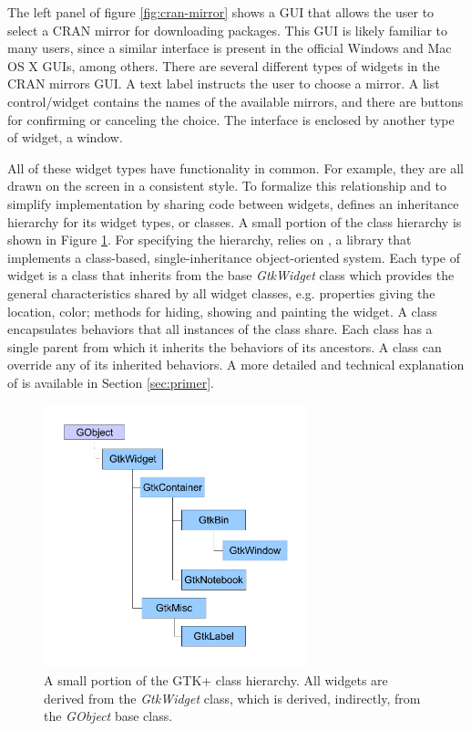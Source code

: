 \documentclass[article]{jss}
\begin{document}
The left panel of figure \ref{fig:cran-mirror} shows a  GUI
that allows the user to select a CRAN mirror for downloading
 packages.  This GUI is likely familiar to many
 users, since a similar interface is present in the
official Windows and Mac OS X  GUIs, among others.  There
are several different types of widgets in the CRAN mirrors GUI.  A
text label instructs the user to choose a mirror.  A list
control/widget contains the names of the available mirrors, and there
are buttons for confirming or canceling the choice.  The interface is
enclosed by another type of widget, a window.

All of these widget types have functionality in common. For example,
they are all drawn on the screen in a consistent style. To formalize
this relationship and to simplify implementation by sharing code
between widgets,  defines an inheritance hierarchy for its
widget types, or classes. A small portion of the  class
hierarchy is shown in Figure \ref{fig:class-hierarchy}. For specifying
the hierarchy,  relies on , a 
library that implements a class-based, single-inheritance
object-oriented system.  Each type of  widget is a
 class that inherits from the base \emph{GtkWidget} class
which provides the general characteristics shared by all widget
classes, e.g. properties giving the location, color; methods for
hiding, showing and painting the widget. A  class
encapsulates behaviors that all instances of the class share.  Each
class has a single parent from which it inherits the behaviors of its
ancestors. A class can override any of its inherited behaviors.  A
more detailed and technical explanation of  is available
in Section \ref{sec:primer}.

\begin{figure}
\begin{center}
\includegraphics[width=3in]{class-hierarchy.pdf}
\caption{\label{fig:class-hierarchy}A small portion of the GTK+ class
hierarchy. 
All widgets are derived from the \emph{GtkWidget} class, which is
derived, 
indirectly, from the \emph{GObject} base class.}
\end{center}
\end{figure}
\end{document}

